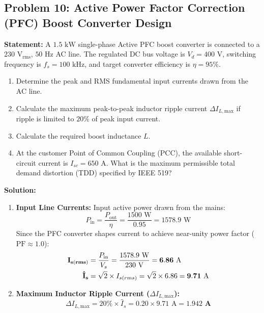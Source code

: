 \documentclass[11pt,a4paper]{article}
\let\origsubsection\subsection
\renewcommand{\subsection}{\Needspace{7\baselineskip}\origsubsection}
\begin{document}
\subsection{Problem 10: Active Power Factor Correction (PFC) Boost Converter Design}
\begin{examplebox}
\textbf{Statement:} A $1.5\text{ kW}$ single-phase Active PFC boost converter is connected to a $230\text{ V}_{\text{rms}}$, $50\text{ Hz}$ AC line. The regulated DC bus voltage is $V_d = 400\text{ V}$, switching frequency is $f_s = 100\text{ kHz}$, and target converter efficiency is $\eta = 95\%$.
\begin{enumerate}
  \item Determine the peak and RMS fundamental input currents drawn from the AC line.
  \item Calculate the maximum peak-to-peak inductor ripple current $\Delta I_{L,\text{max}}$ if ripple is limited to $20\%$ of peak input current.
  \item Calculate the required boost inductance $L$.
  \item At the customer Point of Common Coupling (PCC), the available short-circuit current is $I_{sc} = 650\text{ A}$. What is the maximum permissible total demand distortion (TDD) specified by IEEE 519?
\end{enumerate}

\tcblower
\textbf{Solution:}
\begin{enumerate}
  \item \textbf{Input Line Currents:}
  Input active power drawn from the mains:
  \begin{equation*}
  P_{\text{in}} = \frac{P_{\text{out}}}{\eta} = \frac{1500\text{ W}}{0.95} = 1578.9\text{ W}
  \end{equation*}
  Since the PFC converter shapes current to achieve near-unity power factor ($\text{PF} \approx 1.0$):
  \begin{align*}
  \mathbf{I_{s(rms)}} &= \frac{P_{\text{in}}}{V_s} = \frac{1578.9\text{ W}}{230\text{ V}} = \mathbf{6.86\text{ A}} \notag\\
  \mathbf{\hat{I}_s} &= \sqrt{2} \times I_{s(rms)} = \sqrt{2} \times 6.86 = \mathbf{9.71\text{ A}}
  \end{align*}

  \item \textbf{Maximum Inductor Ripple Current ($\Delta I_{L,\text{max}}$):}
  \begin{equation*}
  \Delta I_{L,\text{max}} = 20\% \times \hat{I}_s = 0.20 \times 9.71\text{ A} = \mathbf{1.942\text{ A}}
  \end{equation*}


\end{enumerate}
\end{examplebox}
\end{document}
